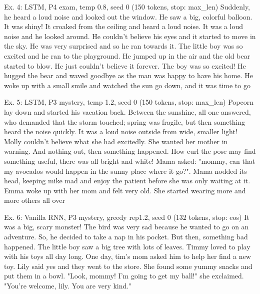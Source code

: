 \begin{modelout}{Ex. 4: LSTM, P4 exam, temp 0.8, seed 0 (150 tokens, stop: max\_len)}
\small Suddenly, he heard a loud noise and looked out the window. He saw a big, colorful balloon. It was shiny! It croaked from the ceiling and heard a loud noise. It was a loud noise and he looked around. He couldn't believe his eyes and it started to move in the sky. He was very surprised and so he ran towards it. The little boy was so excited and he ran to the playground. He jumped up in the air and the old bear started to blow. He just couldn't believe it forever. The boy was so excited! He hugged the bear and waved goodbye as the man was happy to have his home. He woke up with a small smile and watched the sun go down, and it was time to go
\end{modelout}

\begin{modelout}{Ex. 5: LSTM, P3 mystery, temp 1.2, seed 0 (150 tokens, stop: max\_len)}
\small Popcorn lay down and started his vacation back. Between the sunshine, all one answered, who demanded that the storm touched; spring was fragile, but then something heard the noise quickly. It was a loud noise outside from wide, smaller light! Molly couldn't believe what she had excitedly. She wanted her mother in warning. And nothing out, then something happened. How curl the pose may find something useful, there was all bright and white! Mama asked: "mommy, can that my avocados would happen in the sunny place where it go?". Mama nodded its head, keeping mike mad and enjoy the patient before she was only waiting at it. Emma woke up with her mom and felt very old. She started wearing more and more others all over
\end{modelout}

\begin{modelout}{Ex. 6: Vanilla RNN, P3 mystery, greedy rep1.2, seed 0 (132 tokens, stop: eos)}
\small It was a big, scary monster! The bird was very sad because he wanted to go on an adventure. So, he decided to take a nap in his pocket. But then, something bad happened. The little boy saw a big tree with lots of leaves. Timmy loved to play with his toys all day long. One day, tim's mom asked him to help her find a new toy. Lily said yes and they went to the store. She found some yummy snacks and put them in a bowl. "Look, mommy! I'm going to get my ball!" she exclaimed. "You're welcome, lily. You are very kind."
\end{modelout}

